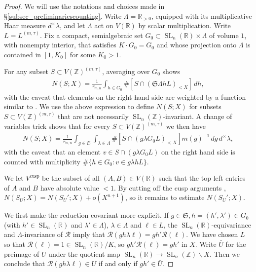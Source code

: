 \documentclass{article} %
\numberwithin{equation}{section}
\DeclareMathOperator{\SL}{SL}
\newcommand{\R}{\mathbb{R}}
\newcommand{\Z}{\mathbb{Z}}
\newcommand{\Siegel}{\mathfrak{S}}
\begin{document}
\begin{proof}
    We will use the notations and choices made in \S\ref{subsec_preliminariescounting}.
    Write $\Lambda = \R_{>0}$, equipped with its multiplicative Haar measure $d^{\times}\lambda$, and let $\Lambda$ act on $V(\R)$ by scalar multiplication.
    Write $L  = L^{(m,\tau)}$.
    Fix a compact, semialgebraic set $G_0\subset \SL_n(\R) \times \Lambda$ of volume $1$, with nonempty interior, that satisfies $K\cdot G_0 = G_0$ and whose projection onto $\Lambda$ is contained in $[1,K_0]$ for some $K_0>1$.
    
    For any subset $S\subset V(\Z)^{(m,\tau)}$, averaging over $G_0$ \cite[Equation (17)]{bhargava2015mosthyperellipticarepointless} shows 
    \begin{align*}
    N(S;X) = \frac{1}{r_{m,n}} \int_{h \in G_0} \#[  S \cap (\Siegel \Lambda h L)_{<X}] \,dh,
    \end{align*}
    with the caveat that elements on the right hand side are weighted by a function similar to \cite[\S6.5, Equation (6.5)]{laga-f4paper}.
    We use the above expression to define $N(S;X)$ for subsets $S\subset V(\Z)^{(m,\tau)}$ that are not necessarily $\SL_n(\Z)$-invariant.
    A change of variables trick \cite[Equation (22)]{BhargavaGross} shows that for every $S\subset V(\Z)^{(m,\tau)}$ we then have
    \begin{align*}
    N(S;X) = \frac{1}{r_{m,n}} \int_{g\in \Siegel} \int_{\lambda \in \Lambda}\#[S \cap (g\lambda G_0 L)_{<X}] m(g)^{-1} \,dg \, d^{\times}\lambda,
    \end{align*}
    with the caveat that an element $v\in S\cap (g\lambda G_0 L)$ on the right hand side is counted with multiplicity $\#\{h\in G_0 \colon v\in g\lambda h L \}$.

    We let $V^{\text{cusp}}$ be the subset of all $(A,B)\in V(\R)$ such that the top left entries of $A$ and $B$ have absolute value $<1$.
    By cutting off the cusp arguments \cite[Proposition 13]{bhargava2015mosthyperellipticarepointless}, $N(S_U;X) = N(S_U';X)+ o(X^{n+1})$, so it remains to estimate $N(S_U';X)$.

    We first make the reduction covariant more explicit.
    If $g\in \Siegel, h = (h',\lambda')\in G_0$ (with $h'\in \SL_n(\R)$ and $\lambda'\in \Lambda$), $\lambda \in \Lambda$ and $\ell \in L$, the $\SL_n(\R)$-equivariance and $\Lambda$-invariance of $\mathcal{R}$ imply that $\mathcal{R}(g h \lambda \ell) = g h' \mathcal{R}(\ell)$.
    We have chosen $L$ so that $\mathcal{R}(\ell) = 1\in \SL_n(\R) / K$, so $gh' \mathcal{R}(\ell) = gh'$ in $X$.
    Write $\bar{U}$ for the preimage of $U$ under the quotient map $\SL_n(\R)\rightarrow \SL_n(\Z)\backslash X$.
    Then we conclude that $\mathcal{R}(gh\lambda \ell) \in U$ if and only if $gh' \in \bar{U}$. 



\end{proof}
\end{document}
